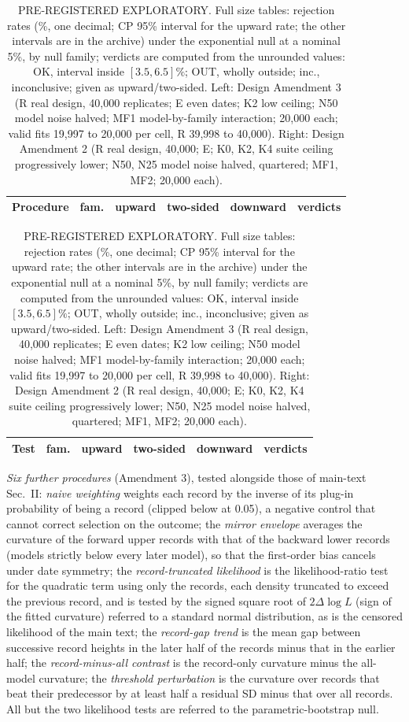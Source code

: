 \documentclass[aps,pre,twocolumn,superscriptaddress,nofootinbib,9pt]{revtex4-2}
\begin{document}
\begin{table}[tb]
\caption{PRE-REGISTERED EXPLORATORY. Full size tables: rejection rates (\%, one decimal; CP 95\% interval for the upward rate; the other intervals are in the archive) under the exponential null at a nominal 5\%, by null family; verdicts are computed from the unrounded values: OK, interval inside $[3.5,6.5]\%$; OUT, wholly outside; inc., inconclusive; given as upward/two-sided. Left: Design Amendment 3 (R real design, 40{,}000 replicates; E even dates; K2 low ceiling; N50 model noise halved; MF1 model-by-family interaction; 20{,}000 each; valid fits 19{,}997 to 20{,}000 per cell, R 39{,}998 to 40{,}000). Right: Design Amendment 2 (R real design, 40{,}000; E; K0, K2, K4 suite ceiling progressively lower; N50, N25 model noise halved, quartered; MF1, MF2; 20{,}000 each).}
\label{tab:sizefull}\label{tab:atwofull}
\tiny\renewcommand{\arraystretch}{0.9}\setlength{\tabcolsep}{1.2pt}
\begin{minipage}[t]{0.49\textwidth}
\begin{tabular}{llcccc}
\hline\hline
Procedure & fam. & upward & two-sided & downward & verdicts \\
\hline

\end{tabular}
\end{minipage}\hfill
\begin{minipage}[t]{0.49\textwidth}
\begin{tabular}{llcccc}
\hline\hline
Test & fam. & upward & two-sided & downward & verdicts \\
\hline

\end{tabular}
\end{minipage}
\end{table}

\emph{Six further procedures} (Amendment 3), tested alongside those of main-text Sec.~II: \emph{naive weighting} weights each record by the inverse of its plug-in probability of being a record (clipped below at 0.05), a negative control that cannot correct selection on the outcome; the \emph{mirror envelope} averages the curvature of the forward upper records with that of the backward lower records (models strictly below every later model), so that the first-order bias cancels under date symmetry; the \emph{record-truncated likelihood} is the likelihood-ratio test for the quadratic term using only the records, each density truncated to exceed the previous record, and is tested by the signed square root of $2\Delta\log L$ (sign of the fitted curvature) referred to a standard normal distribution, as is the censored likelihood of the main text; the \emph{record-gap trend} is the mean gap between successive record heights in the later half of the records minus that in the earlier half; the \emph{record-minus-all contrast} is the record-only curvature minus the all-model curvature; the \emph{threshold perturbation} is the curvature over records that beat their predecessor by at least half a residual SD minus that over all records. All but the two likelihood tests are referred to the parametric-bootstrap null.
\end{document}
